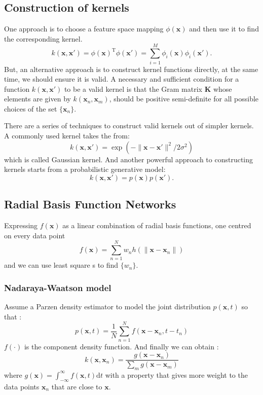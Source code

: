 \documentclass{article}
\newcommand{\mrm}{\mathrm}
\newcommand{\mbf}{\mathbf}
\newcommand{\xx}{\mbf x}
\newcommand{\trans}{^{\mrm T}}
\begin{document}
\subsection{Construction of kernels}
One approach is to choose a feature space mapping $\phi(\xx)$ and then use it to find the corresponding kernel. 
\begin{equation}
    k(\xx,\xx')=\phi(\xx)\trans\phi(\xx') = \sum_{i=1}^{M}\phi_i(\xx)\phi_i(\xx').
\end{equation}
But, an alternative approach is to construct kernel functions directly, at the same time, we should ensure it is valid.  A necessary and sufficient condition for a function $k(\xx, \xx') $ to be a valid kernel is that the Gram matrix $\mbf  K$ whose elements are given by $k(\xx_n,\xx_m)$, should be positive semi-definite for all possible choices of the set $\{\xx_n\}$.

There are a series of techniques to construct valid kernels out of simpler kernels. A commonly used kernel takes the from:
\begin{equation}
    k(\xx,\xx') = \exp(-\|\xx-\xx'\|^2/2\sigma^2)
\end{equation}
which is called Gaussian kernel. And another powerful approach to constructing kernels starts from a probabilistic generative model:
\begin{equation}
    k(\xx,\xx') = p(\xx)p(\xx').
\end{equation}

\subsection{Radial Basis Function Networks}
Expressing $f(\xx)$ as a linear combination of radial basis functions, one centred on every data point 
\begin{equation}
    f(\xx) = \sum_{n=1}^N w_nh(\|\xx-\xx_n\|)
\end{equation}
and we can use least square s to find $\{w_n\}$. 
\subsubsection*{Nadaraya-Waatson model}
Assume a Parzen density estimator to model the joint distribution $p(\xx, t) $ so that :
\begin{equation}
p(\xx,t) = \frac1N\sum_{n=1}^{N}f(\xx-\xx_n,t-t_n)
\end{equation}
$f(\cdot)$ is the component density function. And finally we can obtain :
\begin{equation}
k(\xx,\xx_n) = \frac{g(\xx-\xx_n)}{\sum_mg(\xx-\xx_m)}
\end{equation}
where $g(\xx) = \int_{-\infty}^{\infty}f(\xx,t)\mathrm dt$
with a property that gives more weight to the data points $\xx_n$ that are close to $\xx$.
\end{document}
